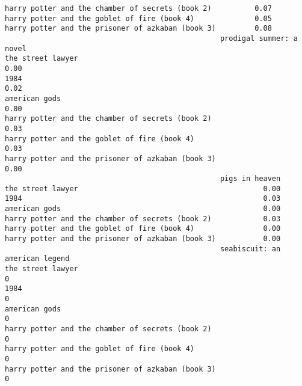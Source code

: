 \documentclass[
]{report}
\begin{document}
\begin{verbatim}
harry potter and the chamber of secrets (book 2)          0.07
harry potter and the goblet of fire (book 4)              0.05
harry potter and the prisoner of azkaban (book 3)         0.08
                                                  prodigal summer: a novel
the street lawyer                                                     0.00
1984                                                                  0.02
american gods                                                         0.00
harry potter and the chamber of secrets (book 2)                      0.03
harry potter and the goblet of fire (book 4)                          0.03
harry potter and the prisoner of azkaban (book 3)                     0.00
                                                  pigs in heaven
the street lawyer                                           0.00
1984                                                        0.03
american gods                                               0.00
harry potter and the chamber of secrets (book 2)            0.03
harry potter and the goblet of fire (book 4)                0.00
harry potter and the prisoner of azkaban (book 3)           0.00
                                                  seabiscuit: an american legend
the street lawyer                                                              0
1984                                                                           0
american gods                                                                  0
harry potter and the chamber of secrets (book 2)                               0
harry potter and the goblet of fire (book 4)                                   0
harry potter and the prisoner of azkaban (book 3)                              0
\end{verbatim}
\end{document}
